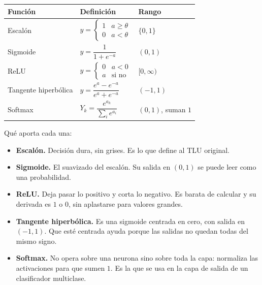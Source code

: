 \documentclass[11pt,letterpaper]{article}
\begin{document}
\begin{center}
\begin{tabular}{lll}
  \toprule
  \textbf{Función} & \textbf{Definición} & \textbf{Rango} \\
  \midrule
  Escalón & $y = \begin{cases} 1 & a \geq \theta \\
                               0 & a < \theta \end{cases}$
          & $\{0, 1\}$ \\
  \addlinespace
  Sigmoide & $y = \dfrac{1}{1 + e^{-a}}$ & $(0, 1)$ \\
  \addlinespace
  ReLU & $y = \begin{cases} 0 & a < 0 \\
                            a & \text{si no} \end{cases}$
       & $[0, \infty)$ \\
  \addlinespace
  Tangente hiperbólica
       & $y = \dfrac{e^{a} - e^{-a}}{e^{a} + e^{-a}}$
       & $(-1, 1)$ \\
  \addlinespace
  Softmax & $Y_k = \dfrac{e^{a_k}}{\sum_i e^{a_i}}$
          & $(0,1)$, suman $1$ \\
  \bottomrule
\end{tabular}
\end{center}

Qué aporta cada una:

\begin{itemize}[itemsep=0.25em]
  \item \textbf{Escalón.} Decisión dura, sin grises. Es lo que define
        al TLU original.
  \item \textbf{Sigmoide.} El suavizado del escalón. Su salida en
        $(0,1)$ se puede leer como una probabilidad.
  \item \textbf{ReLU.} Deja pasar lo positivo y corta lo negativo. Es
        barata de calcular y su derivada es $1$ o $0$, sin aplastarse
        para valores grandes.
  \item \textbf{Tangente hiperbólica.} Es una sigmoide centrada en
        cero, con salida en $(-1,1)$. Que esté centrada ayuda porque
        las salidas no quedan todas del mismo signo.
  \item \textbf{Softmax.} No opera sobre una neurona sino sobre toda
        la capa: normaliza las activaciones para que sumen $1$. Es la
        que se usa en la capa de salida de un clasificador
        multiclase.
\end{itemize}
\end{document}
